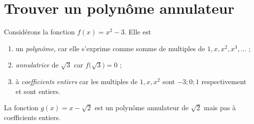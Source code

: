 %
%
%
%
%
%
%
%
%
%
%

\section*{Trouver un polynôme annulateur}

\begin{namedtheorem}[Exemples]
	Considérons la fonction $f(x) = x^2 - 3$. Elle est
	\begin{enumerate}
		\item un \emph{polynôme}, car elle s'exprime comme somme de multiples de $1, x, x^2, x^3, \hdots$ ; 
		\item \emph{annulatrice} de $\sqrt3$ car $f\bigl(\sqrt3\bigr) = 0$ ;
		\item à \emph{coefficients entiers} car les multiples de $1, x, x^2$ sont $-3 ; 0 ; 1$ respectivement et sont entiers.
	\end{enumerate}
	La fonction $g(x) = x-\sqrt2$ est un polynôme annulateur de $\sqrt2$ mais pas à coefficients entiers.
\end{namedtheorem}
	
